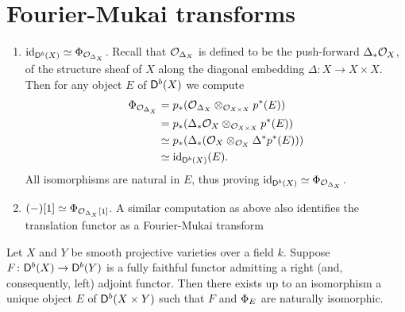 \section{Fourier-Mukai transforms}

\begin{example}
    \label{Identifying fm transforms}
\begin{enumerate}[label = (\roman*)]
    \item{
    $\operatorname{id}_{\mathsf{D}^b(X)} \simeq \Phi_{\mathcal{O}_{\Delta_X}}$. Recall that $\mathcal{O}_{\Delta_X}$ is defined to be the push-forward $\Delta_*\mathcal{O}_{X}$, of the structure sheaf of $X$ along the diagonal embedding $\Delta \colon X \to X \times X$. Then for any object $E$ of $\mathsf{D}^b(X)$ we compute 
    \begin{align*}
        \Phi_{\mathcal{O}_{\Delta_X}} &= p_*(\mathcal{O}_{\Delta_X} \otimes_{\mathcal{O}_{X \times X}} p^*(E)) \\
        &= p_*(\Delta_*\mathcal{O}_{X} \otimes_{\mathcal{O}_{X \times X}} p^*(E)) \\
        &\simeq p_*(\Delta_*(\mathcal{O}_{X} \otimes_{\mathcal{O}_{X}} \Delta^*p^*(E))) \\
        &\simeq \operatorname{id}_{\mathsf{D}^b(X)}(E).
    \end{align*}
    All isomorphisms are natural in $E$, thus proving $\operatorname{id}_{\mathsf{D}^b(X)} \simeq \Phi_{\mathcal{O}_{\Delta_X}}$.
    }
    \item{$(-)[1] \simeq \Phi_{\mathcal{O}_{\Delta_X}[1]}$. A similar computation as above also identifies the translation functor as a Fourier-Mukai transform}
\end{enumerate}
\end{example}

\begin{theorem}
    \label{Orlov's theorem}
    Let $X$ and $Y$ be smooth projective varieties over a field $k$. Suppose $F \colon \mathsf{D}^b(X) \to \mathsf{D}^b(Y)$ is a fully faithful functor admitting a right (and, consequently, left) adjoint functor. Then there exists up to an isomorphism a unique object $E$ of $\mathsf{D}^b(X \times Y)$ such that $F$ and $\Phi_{E}$ are naturally isomorphic.
\end{theorem}

